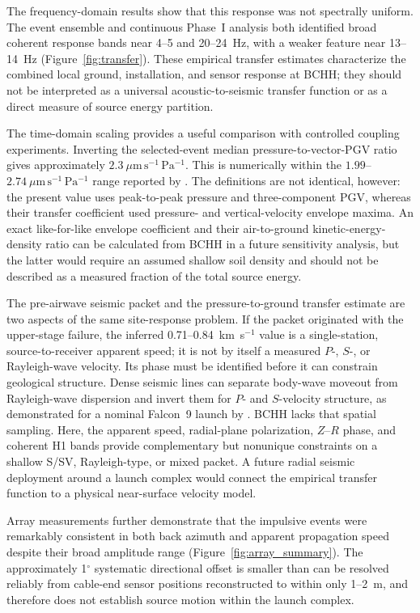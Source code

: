 \documentclass[]{seismica}
\begin{document}
The frequency-domain results show that this response was not spectrally
uniform. The event ensemble and continuous Phase~I analysis both identified
broad coherent response bands near 4--5 and 20--24~Hz, with a weaker feature
near 13--14~Hz (Figure~\ref{fig:transfer}). These empirical transfer estimates
characterize the combined local ground, installation, and sensor response at
BCHH; they should not be interpreted as a universal acoustic-to-seismic
transfer function or as a direct measure of source energy partition.

The time-domain scaling provides a useful comparison with controlled coupling
experiments. Inverting the selected-event median pressure-to-vector-PGV ratio
gives approximately $2.3~\mu\mathrm{m\,s^{-1}\,Pa^{-1}}$. This is numerically
within the $1.99$--$2.74~\mu\mathrm{m\,s^{-1}\,Pa^{-1}}$ range reported by
\citet{novoselov_ground_coupling_2020}. The definitions are not identical,
however: the present value uses peak-to-peak pressure and three-component PGV,
whereas their transfer coefficient used pressure- and vertical-velocity
envelope maxima. An exact like-for-like envelope coefficient and their
air-to-ground kinetic-energy-density ratio can be calculated from BCHH in a
future sensitivity analysis, but the latter would require an assumed shallow
soil density and should not be described as a measured fraction of the total
source energy.

The pre-airwave seismic packet and the pressure-to-ground transfer estimate are
two aspects of the same site-response problem. If the packet originated with
the upper-stage failure, the inferred 0.71--0.84~km~s$^{-1}$ value is a
single-station, source-to-receiver apparent speed; it is not by itself a
measured $P$-, $S$-, or Rayleigh-wave velocity. Its phase must be identified
before it can constrain geological structure. Dense seismic lines can separate
body-wave moveout from Rayleigh-wave dispersion and invert them for $P$- and
$S$-velocity structure, as demonstrated for a nominal Falcon~9 launch by
\citet{schuster_rocketquake_2025}. BCHH lacks that spatial sampling. Here, the
apparent speed, radial-plane polarization, $Z$--$R$ phase, and coherent H1 bands
provide complementary but nonunique constraints on a shallow S/SV,
Rayleigh-type, or mixed packet. A future radial seismic deployment around a
launch complex would connect the empirical transfer function to a physical
near-surface velocity model.

Array measurements further demonstrate that the impulsive events were
remarkably consistent in both back azimuth and apparent propagation speed
despite their broad amplitude range (Figure~\ref{fig:array_summary}). The
approximately 1$^\circ$ systematic directional offset is smaller than can be
resolved reliably from cable-end sensor positions reconstructed to within only
1--2~m, and therefore does not establish source motion within the launch
complex.
\end{document}
